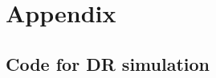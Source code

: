 \documentclass[12pt,twoside]{article}
\begin{document}
\clearpage



\clearpage
\section*{Appendix}

\subsection*{Code for DR simulation}


\end{document}
